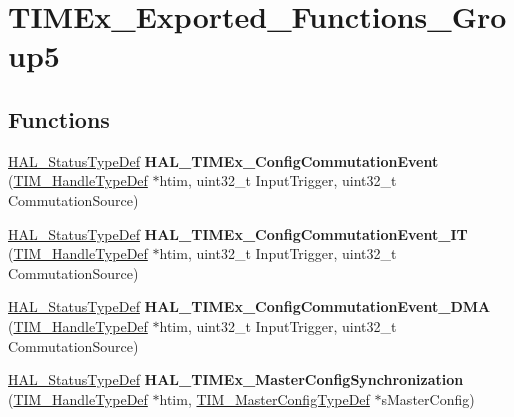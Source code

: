 \hypertarget{group___t_i_m_ex___exported___functions___group5}{}\section{T\+I\+M\+Ex\+\_\+\+Exported\+\_\+\+Functions\+\_\+\+Group5}
\label{group___t_i_m_ex___exported___functions___group5}
\subsection*{Functions}
\begin{DoxyCompactItemize}
\item 
\hyperlink{stm32f4xx__hal__def_8h_a63c0679d1cb8b8c684fbb0632743478f}{H\+A\+L\+\_\+\+Status\+Type\+Def} {\bfseries H\+A\+L\+\_\+\+T\+I\+M\+Ex\+\_\+\+Config\+Commutation\+Event} (\hyperlink{struct_t_i_m___handle_type_def}{T\+I\+M\+\_\+\+Handle\+Type\+Def} $\ast$htim, uint32\+\_\+t Input\+Trigger, uint32\+\_\+t Commutation\+Source)\hypertarget{group___t_i_m_ex___exported___functions___group5_ga0870c20c0412896f6321f71ede9e5a3d}{}\label{group___t_i_m_ex___exported___functions___group5_ga0870c20c0412896f6321f71ede9e5a3d}

\item 
\hyperlink{stm32f4xx__hal__def_8h_a63c0679d1cb8b8c684fbb0632743478f}{H\+A\+L\+\_\+\+Status\+Type\+Def} {\bfseries H\+A\+L\+\_\+\+T\+I\+M\+Ex\+\_\+\+Config\+Commutation\+Event\+\_\+\+IT} (\hyperlink{struct_t_i_m___handle_type_def}{T\+I\+M\+\_\+\+Handle\+Type\+Def} $\ast$htim, uint32\+\_\+t Input\+Trigger, uint32\+\_\+t Commutation\+Source)\hypertarget{group___t_i_m_ex___exported___functions___group5_ga2a50ed8d310449f6535c6627da26ed35}{}\label{group___t_i_m_ex___exported___functions___group5_ga2a50ed8d310449f6535c6627da26ed35}

\item 
\hyperlink{stm32f4xx__hal__def_8h_a63c0679d1cb8b8c684fbb0632743478f}{H\+A\+L\+\_\+\+Status\+Type\+Def} {\bfseries H\+A\+L\+\_\+\+T\+I\+M\+Ex\+\_\+\+Config\+Commutation\+Event\+\_\+\+D\+MA} (\hyperlink{struct_t_i_m___handle_type_def}{T\+I\+M\+\_\+\+Handle\+Type\+Def} $\ast$htim, uint32\+\_\+t Input\+Trigger, uint32\+\_\+t Commutation\+Source)\hypertarget{group___t_i_m_ex___exported___functions___group5_gac821ce78d607cca00a5f06496beed76e}{}\label{group___t_i_m_ex___exported___functions___group5_gac821ce78d607cca00a5f06496beed76e}

\item 
\hyperlink{stm32f4xx__hal__def_8h_a63c0679d1cb8b8c684fbb0632743478f}{H\+A\+L\+\_\+\+Status\+Type\+Def} {\bfseries H\+A\+L\+\_\+\+T\+I\+M\+Ex\+\_\+\+Master\+Config\+Synchronization} (\hyperlink{struct_t_i_m___handle_type_def}{T\+I\+M\+\_\+\+Handle\+Type\+Def} $\ast$htim, \hyperlink{struct_t_i_m___master_config_type_def}{T\+I\+M\+\_\+\+Master\+Config\+Type\+Def} $\ast$s\+Master\+Config)\hypertarget{group___t_i_m_ex___exported___functions___group5_ga056fd97d3be6c60dcfa12963f6ec8aad}{}\label{group___t_i_m_ex___exported___functions___group5_ga056fd97d3be6c60dcfa12963f6ec8aad}


\end{DoxyCompactItemize}
